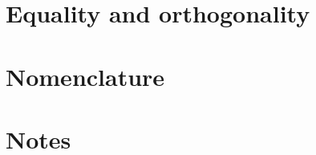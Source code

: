 \documentclass[preprint,12pt]{elsarticle}
\begin{document}
% 

% 

% 

% 

\section{Equality and orthogonality} \label{sec:Eq_Orth}


% 

\clearpage
\section{Nomenclature} \label{sec:Nomenclature}


\section{Notes} \label{sec:Notes}



 

\end{document}
